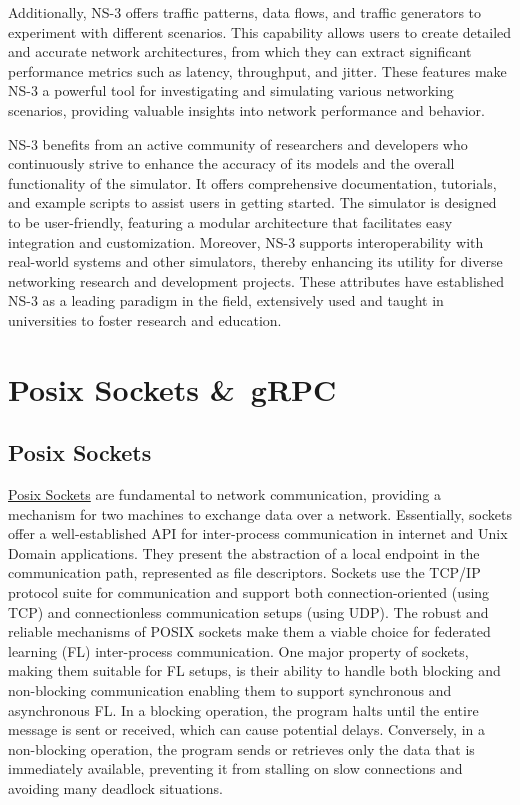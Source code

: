 Additionally, NS-3 offers traffic patterns, data flows, and traffic generators to experiment with different scenarios. This capability allows users to create detailed
and accurate network architectures, from which they can extract significant performance metrics such as latency, throughput, and jitter. These features make NS-3 a
powerful tool for investigating and simulating various networking scenarios, providing valuable insights into network performance and behavior.

NS-3 benefits from an active community of researchers and developers who continuously strive to enhance the accuracy of its models and the overall functionality
of the simulator. It offers comprehensive documentation, tutorials, and example scripts to assist users in getting started. The simulator is designed to be
user-friendly, featuring a modular architecture that facilitates easy integration and customization. Moreover, NS-3 supports interoperability with real-world
systems and other simulators, thereby enhancing its utility for diverse networking research and development projects. These attributes have established NS-3 as
a leading paradigm in the field, extensively used and taught in universities to foster research and education.

\section{Posix Sockets \&\ gRPC}
\subsection{Posix Sockets}
\href{https://www.wikiwand.com/en/Berkeley_sockets}{Posix Sockets}
are fundamental to network communication, providing a mechanism for two machines to exchange data over a network. Essentially, sockets offer a well-established API for
inter-process communication in internet and Unix Domain applications. They present the abstraction of a local endpoint in the communication path, represented as file descriptors.
Sockets use the TCP/IP protocol suite for communication and support both connection-oriented (using TCP) and connectionless communication setups (using UDP).
The robust and reliable mechanisms of POSIX sockets make them a viable choice for federated learning (FL) inter-process communication. One major property of sockets,
making them suitable for FL setups, is their ability to handle both blocking and non-blocking communication enabling them to support synchronous and asynchronous FL.
In a blocking operation, the program halts until the entire message is sent or received, which can cause potential delays. Conversely, in a non-blocking operation, the
program sends or retrieves only the data that is immediately available, preventing it from stalling on slow connections and avoiding many deadlock situations.

